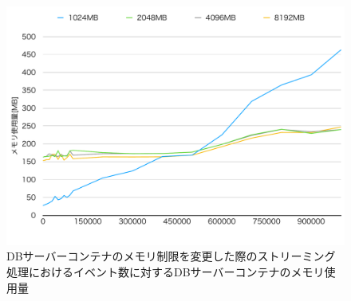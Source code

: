 \documentclass[../../../../../main]{subfiles}
\begin{document}
    \begin{figure}[H]
        \centering
        \includegraphics[width=12cm]{graph}
        \caption{DBサーバーコンテナのメモリ制限を変更した際のストリーミング処理におけるイベント数に対するDBサーバーコンテナのメモリ使用量}
        \label{fig:stream-change-db-memory-limit-db-memory-app_4_8192-db_400}
    \end{figure}
\end{document}
